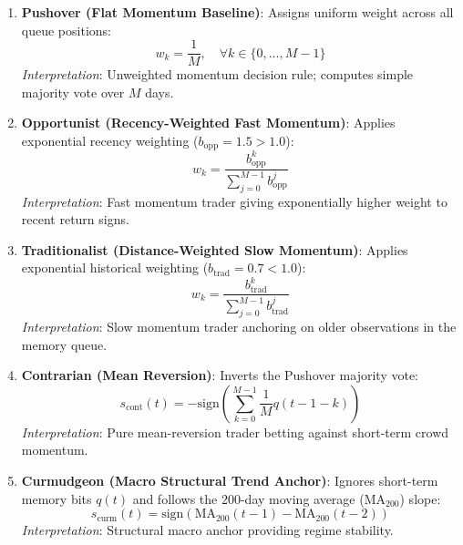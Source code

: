 \documentclass[11pt,a4paper]{article}
\begin{document}
\begin{enumerate}
    \item \textbf{Pushover (Flat Momentum Baseline)}:
    Assigns uniform weight across all queue positions:
    \begin{equation}
        w_k = \frac{1}{M}, \quad \forall k \in \{0, \dots, M-1\}
    \end{equation}
    \textit{Interpretation}: Unweighted momentum decision rule; computes simple majority vote over $M$ days.

    \item \textbf{Opportunist (Recency-Weighted Fast Momentum)}:
    Applies exponential recency weighting ($b_{\text{opp}} = 1.5 > 1.0$):
    \begin{equation}
        w_k = \frac{b_{\text{opp}}^k}{\sum_{j=0}^{M-1} b_{\text{opp}}^j}
    \end{equation}
    \textit{Interpretation}: Fast momentum trader giving exponentially higher weight to recent return signs.

    \item \textbf{Traditionalist (Distance-Weighted Slow Momentum)}:
    Applies exponential historical weighting ($b_{\text{trad}} = 0.7 < 1.0$):
    \begin{equation}
        w_k = \frac{b_{\text{trad}}^k}{\sum_{j=0}^{M-1} b_{\text{trad}}^j}
    \end{equation}
    \textit{Interpretation}: Slow momentum trader anchoring on older observations in the memory queue.

    \item \textbf{Contrarian (Mean Reversion)}:
    Inverts the Pushover majority vote:
    \begin{equation}
        s_{\text{cont}}(t) = -\text{sign}\left( \sum_{k=0}^{M-1} \frac{1}{M} q(t-1-k) \right)
    \end{equation}
    \textit{Interpretation}: Pure mean-reversion trader betting against short-term crowd momentum.

    \item \textbf{Curmudgeon (Macro Structural Trend Anchor)}:
    Ignores short-term memory bits $q(t)$ and follows the 200-day moving average ($\text{MA}_{200}$) slope:
    \begin{equation}
        s_{\text{curm}}(t) = \text{sign}\left( \text{MA}_{200}(t-1) - \text{MA}_{200}(t-2) \right)
    \end{equation}
    \textit{Interpretation}: Structural macro anchor providing regime stability.
\end{enumerate}
\end{document}
